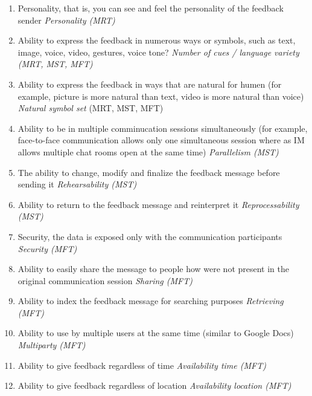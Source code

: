 \documentclass[english,12pt,a4paper,pdftex]{article}
\begin{document}
\begin{enumerate}
\begin{enumerate}
    \item Personality, that is, you can see and feel the personality of the feedback sender \textit{Personality (MRT)}
    
    \item Ability to express the feedback in numerous ways or symbols, such as text, image, voice, video, gestures, voice tone? \emph{Number of cues / language variety (MRT, MST, MFT)}
    
    \item Ability to express the feedback in ways that are natural for humen (for example, picture is more natural than text, video is more natural than voice) \emph{Natural symbol set} (MRT, MST, MFT)
    
    \item Ability to be in multiple comminucation sessions simultaneously (for example, face-to-face communication allows only one simultaneous session where as \ac{IM} allows multiple chat rooms open at the same time) \emph{Parallelism (MST)}
    
    \item The ability to change, modify and finalize the feedback message before sending it \emph{Rehearsability (MST)}
    
    \item Ability to return to the feedback message and reinterpret it \emph{Reprocessability (MST)}
    
    \item Security, the data is exposed only with the communication participants \emph{Security (MFT)}
    
    \item Ability to easily share the message to people how were not present in the original communication session \emph{Sharing (MFT)}
    
    \item Ability to index the feedback message for searching purposes \emph{Retrieving (MFT)}
    
    \item Ability to use by multiple users at the same time (similar to Google Docs) \emph{Multiparty (MFT)}
    
    \item Ability to give feedback regardless of time \emph{Availability time (MFT)}
    
    \item Ability to give feedback regardless of location \emph{Availability location (MFT)}
    

\end{enumerate}
\end{enumerate}
\end{document}
